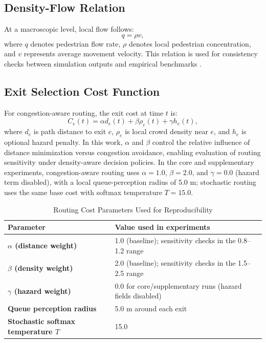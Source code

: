 \documentclass[journal]{IEEEtran}
\begin{document}
\subsection{Density-Flow Relation}
At a macroscopic level, local flow follows:
\begin{equation}
    q = \rho v,
    \label{eq:qrv}
\end{equation}
where $q$ denotes pedestrian flow rate, $\rho$ denotes local pedestrian concentration, and $v$ represents average movement velocity. This relation is used for consistency checks between simulation outputs and empirical benchmarks \cite{fruin,weidmann1993}.

\subsection{Exit Selection Cost Function}
For congestion-aware routing, the exit cost at time $t$ is:
\begin{equation}
    C_e(t)=\alpha d_e(t)+\beta \rho_e(t)+\gamma h_e(t),
    \label{eq:cost}
\end{equation}
where $d_e$ is path distance to exit $e$, $\rho_e$ is local crowd density near $e$, and $h_e$ is optional hazard penalty. In this work, $\alpha$ and $\beta$ control the relative influence of distance minimization versus congestion avoidance, enabling evaluation of routing sensitivity under density-aware decision policies. In the core and supplementary experiments, congestion-aware routing uses $\alpha=1.0$, $\beta=2.0$, and $\gamma=0.0$ (hazard term disabled), with a local queue-perception radius of 5.0 m; stochastic routing uses the same base cost with softmax temperature $T=15.0$.

\begin{table}[t]
\centering
\caption{Routing Cost Parameters Used for Reproducibility}
\label{tab:routing_params}
{\footnotesize
\setlength{\tabcolsep}{3pt}
\begin{tabular}{>{\bfseries}p{2.0cm} p{4.8cm}}
\toprule
Parameter & Value used in experiments \\
\midrule
$\alpha$ (distance weight) & 1.0 (baseline); sensitivity checks in the 0.8--1.2 range \\
$\beta$ (density weight) & 2.0 (baseline); sensitivity checks in the 1.5--2.5 range \\
$\gamma$ (hazard weight) & 0.0 for core/supplementary runs (hazard fields disabled) \\
Queue perception radius & 5.0 m around each exit \\
Stochastic softmax temperature $T$ & 15.0 \\
\bottomrule
\end{tabular}
}
\end{table}
\end{document}
